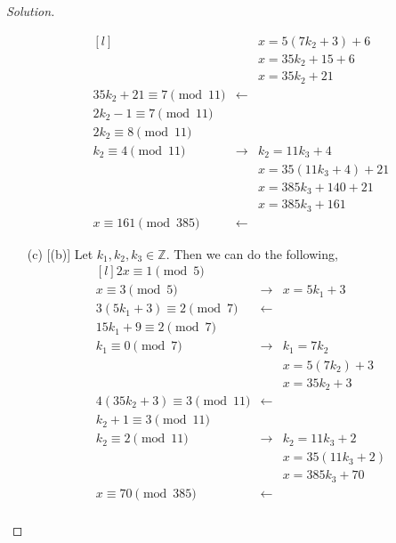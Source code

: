 \documentclass[11pt]{article}
\newcommand{\Z}{\mathbb{Z}}
\newenvironment{solution}
  {\renewcommand\qedsymbol{$~$}\begin{proof}[Solution]$ $\par\nobreak\ignorespaces}
  {\end{proof}}
\begin{document}
\begin{solution}
\begin{itemize}
\[\begin{matrix*}[l]
                      &             & x= 5(7k_2 + 3) + 6    \\
                      &             & x= 35k_2 + 15 + 6     \\
                      &             & x= 35k_2 + 21         \\
                      35k_2 + 21 \equiv 7 \pmod{11} & \leftarrow  &                       \\
                      2k_2 - 1 \equiv 7 \pmod{11}   &             &                       \\
                      2k_2 \equiv 8 \pmod{11}       &             &                       \\
                      k_2 \equiv 4 \pmod{11}        & \rightarrow & k_2 = 11k_3 + 4       \\
                      &             & x= 35(11k_3 + 4) + 21 \\
                      &             & x= 385k_3 + 140 + 21  \\
                      &             & x= 385k_3 + 161       \\
                      x \equiv 161 \pmod{385}       & \leftarrow  &
                  \end{matrix*}
              \]
        \item [(c)] [(b)] Let $k_1, k_2, k_3 \in \Z$. Then we can do the following,
              \[
                  \begin{matrix*}[l]
                      2x \equiv 1 \pmod{5}          &             &                 \\
                      x \equiv 3 \pmod{5}           & \rightarrow & x= 5k_1 + 3     \\
                      3(5k_1 + 3) \equiv 2 \pmod{7} & \leftarrow  &                 \\
                      15k_1 + 9 \equiv 2 \pmod{7}   &             &                 \\
                      k_1 \equiv 0 \pmod{7}         & \rightarrow & k_1 = 7k_2      \\
                      &             & x= 5(7k_2) +3   \\
                      &             & x= 35k_2 + 3    \\
                      4(35k_2+3) \equiv 3 \pmod{11} & \leftarrow  &                 \\
                      k_2 + 1 \equiv 3 \pmod{11}    &             &                 \\
                      k_2 \equiv 2 \pmod{11}        & \rightarrow & k_2 = 11k_3 + 2 \\
                      &             & x= 35(11k_3+2)  \\
                      &             & x= 385k_3 + 70  \\
                      x\equiv 70 \pmod{385}         & \leftarrow  &                 \\
                  \end{matrix*}
              \]
    \end{itemize}
\end{solution}
\end{document}
